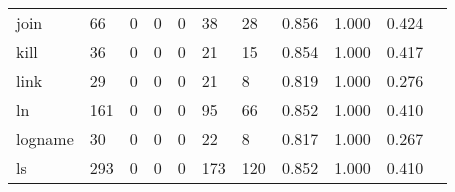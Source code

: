 \begin{longtable}{lp{1.2cm}p{1.2cm}p{1.2cm}p{1.2cm}p{1.2cm}p{1.2cm}p{1.2cm}p{1.2cm}p{1.2cm}p{1.2cm}}
join      &                                    66 &                                                  0 &                                                  0 &                                                  0 &                                                 38 &                                                 28 &                                         0.856 &                                              1.000 &                                              0.424 \\
kill      &                                    36 &                                                  0 &                                                  0 &                                                  0 &                                                 21 &                                                 15 &                                         0.854 &                                              1.000 &                                              0.417 \\
link      &                                    29 &                                                  0 &                                                  0 &                                                  0 &                                                 21 &                                                  8 &                                         0.819 &                                              1.000 &                                              0.276 \\
ln        &                                   161 &                                                  0 &                                                  0 &                                                  0 &                                                 95 &                                                 66 &                                         0.852 &                                              1.000 &                                              0.410 \\
logname   &                                    30 &                                                  0 &                                                  0 &                                                  0 &                                                 22 &                                                  8 &                                         0.817 &                                              1.000 &                                              0.267 \\
ls        &                                   293 &                                                  0 &                                                  0 &                                                  0 &                                                173 &                                                120 &                                         0.852 &                                              1.000 &                                              0.410 \\

\end{longtable}
